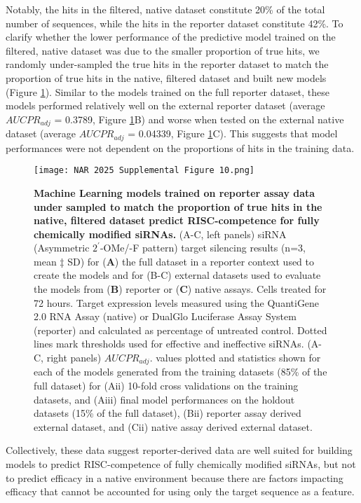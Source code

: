 \documentclass{report}
\begin{document}
Notably, the hits in the filtered, native dataset constitute 20\% of the total number of sequences, while the hits in the reporter dataset constitute 42\%. To clarify whether the lower performance of the predictive model trained on the filtered, native dataset was due to the smaller proportion of true hits, we randomly under-sampled the true hits in the reporter dataset to match the proportion of true hits in the native, filtered dataset and built new models (Figure \ref{fig:Supplemental Figure** 10}). Similar to the models trained on the full reporter dataset, these models performed relatively well on the external reporter dataset (average $AUCPR_{adj}$ = 0.3789,  Figure \ref{fig:Supplemental Figure** 10}B) and worse when tested on the external native dataset (average $AUCPR_{adj}$ = 0.04339, Figure \ref{fig:Supplemental Figure** 10}C). This suggests that model performances were not dependent on the proportions of hits in the training data.

\begin{figure}
    \centering
    \texttt{[image: NAR 2025 Supplemental Figure 10.png]}
    \caption{\textbf{Machine Learning models trained on reporter assay data under sampled to match the proportion of true hits in the native, filtered dataset predict RISC-competence for fully chemically modified siRNAs. }(A-C, left panels) siRNA (Asymmetric $2^\prime$-OMe/-F pattern) target silencing results (n=3, mean ‡ SD) for (\textbf{A}) the full dataset in a reporter context used to create the models and for (B-C) external datasets used to evaluate the models from (\textbf{B}) reporter or (\textbf{C}) native assays. Cells treated for 72 hours. Target expression levels measured using the QuantiGene 2.0 RNA Assay (native) or DualGlo Luciferase Assay System (reporter) and calculated as percentage of untreated control. Dotted lines mark thresholds used for effective and ineffective siRNAs. (A-C, right panels) $AUCPR_{adj}$. values plotted and statistics shown for each of the models generated from the training datasets (85\% of the full dataset) for (Aii) 10-fold cross validations on the training datasets, and (Aiii) final model performances on the holdout datasets (15\% of the full dataset), (Bii) reporter assay derived external dataset, and (Cii) native assay derived external dataset.
}
    \label{fig:Supplemental Figure** 10}
\end{figure}

Collectively, these data suggest reporter-derived data are well suited for building models to predict RISC-competence of fully chemically modified siRNAs, but not to predict efficacy in a native environment because there are factors impacting efficacy that cannot be accounted for using only the target sequence as a feature.
\end{document}
